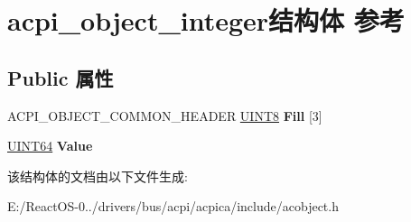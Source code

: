 \hypertarget{structacpi__object__integer}{}\section{acpi\+\_\+object\+\_\+integer结构体 参考}
\label{structacpi__object__integer}
\subsection*{Public 属性}
\begin{DoxyCompactItemize}
\item 
\mbox{\label{structacpi__object__integer_a34163189c986c28f60e54753933407f5}} 
A\+C\+P\+I\+\_\+\+O\+B\+J\+E\+C\+T\+\_\+\+C\+O\+M\+M\+O\+N\+\_\+\+H\+E\+A\+D\+ER \hyperlink{_processor_bind_8h_ab27e9918b538ce9d8ca692479b375b6a}{U\+I\+N\+T8} {\bfseries Fill} \mbox{[}3\mbox{]}
\item 
\mbox{\label{structacpi__object__integer_a7e633f0d0b58779103bae32998a5d04d}} 
\hyperlink{_processor_bind_8h_a57be03562867144161c1bfee95ca8f7c}{U\+I\+N\+T64} {\bfseries Value}
\end{DoxyCompactItemize}


该结构体的文档由以下文件生成\+:\begin{DoxyCompactItemize}
\item 
E\+:/\+React\+O\+S-\/0../drivers/bus/acpi/acpica/include/acobject.\+h\end{DoxyCompactItemize}
